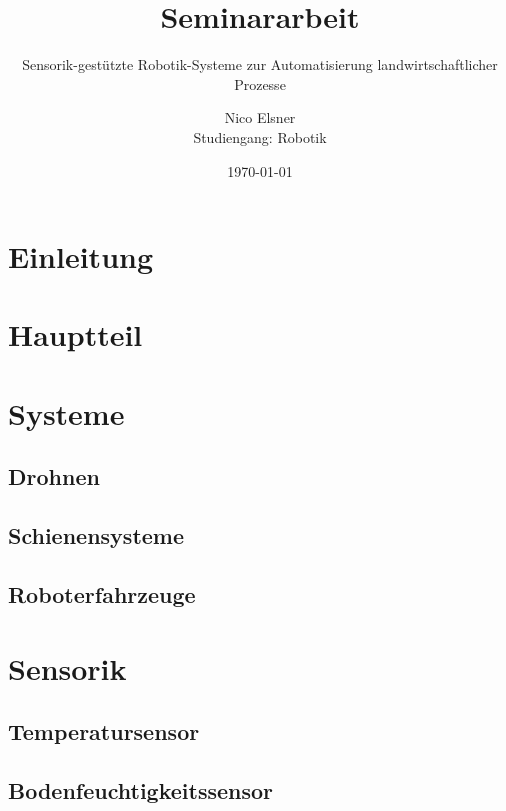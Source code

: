 \documentclass[a4paper,
			   11pt,
			   ngerman, 
			   ]{scrreprt}
\begin{document}
	\title{Seminararbeit}
	\subtitle{Sensorik-gestützte Robotik-Systeme zur Automatisierung landwirtschaftlicher Prozesse}
	\author{Nico Elsner\\
	Studiengang: Robotik}
	\date{\today}
	\maketitle
	\tableofcontents
	\thispagestyle{empty}
	\newpage
	\setcounter{page}{1}
	\chapter{Einleitung}
	
	\chapter{Hauptteil}
	
	
	\chapter{Systeme}
		\section{Drohnen}
		
		\section{Schienensysteme}
		
		\section{Roboterfahrzeuge}
		

	\chapter{Sensorik}
	
		\section{Temperatursensor}
		
		\cite{oriolplanas2021}
		\section{Bodenfeuchtigkeitssensor}
		
\end{document}
